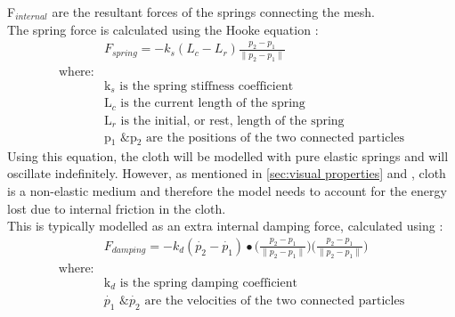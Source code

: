 F$_{internal}$ are the resultant forces of the springs connecting the mesh.
\\The spring force is calculated using the Hooke equation \parencite[201]{Parent2012}:
\begin{equation}
\begin{split}
\label{eq:hooke equation}
  &F_{spring} = -k_{s}(L_{c}-L_{r})\frac{p_{2}-p_{1}}{\parallel p_{2}-p_{1}\parallel}
  \\\text{where:}
  \\&\text{k$_{s}$ is the spring stiffness coefficient}
  \\&\text{L$_{c}$ is the current length of the spring}
  \\&\text{L$_{r}$ is the initial, or rest, length of the spring}
  \\&\text{p$_{1}$ \& p$_{2}$ are the positions of the two connected particles}
\end{split}
\end{equation}
Using this equation, the cloth will be modelled with pure elastic springs and will oscillate indefinitely. However, as mentioned in \ref{sec:visual properties} and \textcite[1]{Provot2001}, cloth is a non-elastic medium and therefore the model needs to account for the energy lost due to internal friction in the cloth.
\\This is typically modelled as an extra internal damping force, calculated using \parencite[201]{Parent2012}:
\begin{equation}
\begin{split}
\label{eq:spring damping}
  &F_{damping} = -k_{d}(\dot{p_{2}}-\dot{p_{1}})\bullet\bigg(\frac{p_{2}-p_{1}}{\parallel p_{2}-p_{1}\parallel}\bigg)\bigg(\frac{p_{2}-p_{1}}{\parallel p_{2}-p_{1}\parallel}\bigg)
  \\\text{where:}
  \\&\text{k$_{d}$ is the spring damping coefficient}
  \\&\text{$\dot{p_{1}}$ \& $\dot{p_{2}}$ are the velocities of the two connected particles}
\end{split}
\end{equation}

